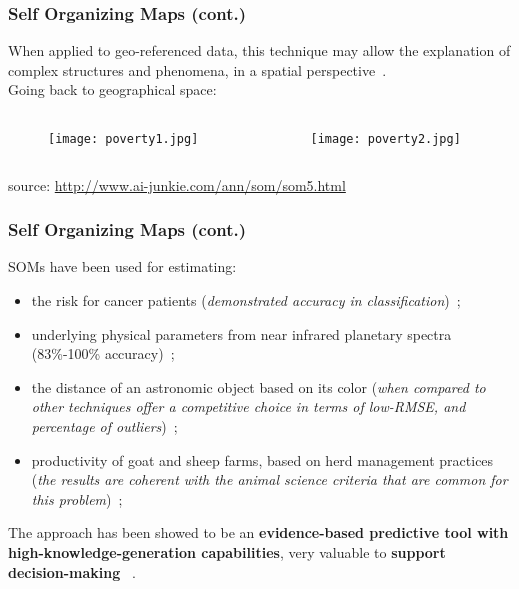 \documentclass[hyperref={pdfpagelabels=true}]{beamer}
\begin{document}
\begin{frame}
\frametitle{Self Organizing Maps (cont.)}
When applied to geo-referenced data, this technique may allow the
explanation of complex structures and phenomena, in a spatial perspective~\cite{gorricha}.\\
\vspace{5mm}
Going back to geographical space:
\begin{columns}
  \begin{column}{5cm}
    \begin{figure}
    \texttt{[image: poverty1.jpg]}
    \end{figure}
  \end{column}
  \begin{column}{5cm}
    \begin{figure}
    \texttt{[image: poverty2.jpg]}
    \end{figure}
  \end{column}
\end{columns}
\tiny{source: \url{http://www.ai-junkie.com/ann/som/som5.html}}\\
\end{frame}

\begin{frame}
\frametitle{Self Organizing Maps (cont.)}
SOMs have been used for estimating:
\begin{itemize}
\item the risk for cancer patients (\textit{demonstrated accuracy in classification})~\cite{cancer};
\item underlying physical parameters from near infrared planetary spectra (83\%-100\% accuracy)~\cite{infrared};
\item the distance of an astronomic object based on its color (\textit{when compared to other techniques offer a competitive choice in terms of low-RMSE, and percentage of outliers})~\cite{redshift};
\item productivity of goat and sheep farms, based on herd management practices (\textit{the results are coherent with the animal science criteria that are common for this problem})~\cite{goat};
\end{itemize}
The approach has been showed to be an \textbf{evidence-based predictive tool with high-knowledge-generation capabilities}, very valuable to \textbf{support decision-making} ~\cite{cancer}.
\end{frame}
\end{document}
